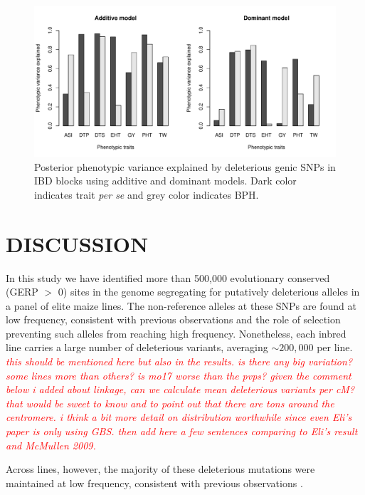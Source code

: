 \documentclass[twoside,twocolumn, letterpaper]{article}
\newcommand{\jri}[1]{\textcolor{red}{ \emph{ #1}} }
\begin{document}
\begin{figure}[htbp]
\centering
\includegraphics[width=\linewidth]{Figure_h2.pdf}
\caption{Posterior phenotypic variance explained by deleterious genic SNPs in IBD blocks using additive and dominant models. Dark color indicates trait \emph{per se} and grey color indicates BPH. }  
\label{fig:h2}
\end{figure}


\section*{DISCUSSION}

In this study we have identified more than 500,000 evolutionary conserved (GERP $>$ 0) sites in the genome segregating for putatively deleterious alleles in a panel of elite maize lines. 
The non-reference alleles at these SNPs are found at low frequency, consistent with previous observations \citep{Mezmouk2014, rodgers2015recombination} and the role of selection preventing such alleles from reaching high frequency. 
Nonetheless, each inbred line carries a large number of deleterious variants, averaging $\sim 200,000$ per line. 
\jri{this should be mentioned here but also in the results. is there any big variation?  some lines more than others? is mo17 worse than the pvps? given the comment below i added about linkage, can we calculate mean deleterious variants per cM?  that would be sweet to know and to point out that there are tons around the centromere. i think a bit more detail on distribution worthwhile since even Eli's paper is only using GBS. then add here a few sentences comparing to Eli's result and McMullen 2009.}

Across lines, however, the majority of these deleterious mutations were maintained at low frequency, consistent with previous observations \citep{rodgers2015recombination}. 
\end{document}
